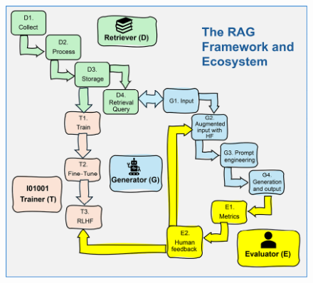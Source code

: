 \documentclass[a4paper, 12pt]{article}
\newcommand{\citeb}[1]{\bibleftbracket\cite{#1}\bibrightbracket}
\begin{document}

    \begin{figure}[ht]
        \includegraphics[width=\textwidth,height=0.9\textheight,keepaspectratio]{rag-framework-ecosystem-denis-rothman.png}
        \centering
        \centering
    \end{figure}

\end{document}
